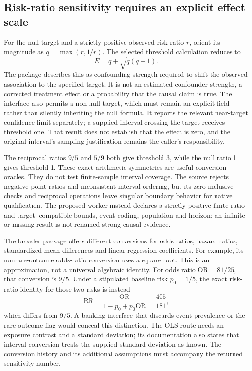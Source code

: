 \subsection{Risk-ratio sensitivity requires an explicit effect scale}
\label{exec23:sensitivity-reuse-ratio}
For the null target and a strictly positive observed risk ratio $r$, orient
its magnitude as $q=\max(r,1/r)$. The selected threshold calculation reduces to
\[
 E=q+\sqrt{q(q-1)}.
\]
The package describes this as confounding strength required to shift the
observed association to the specified target. It is not an estimated
confounder strength, a corrected treatment effect or a probability that the
causal claim is true. The interface also permits a non-null target, which must
remain an explicit field rather than silently inheriting the null formula.
It reports the relevant near-target confidence limit separately; a supplied
interval crossing the target receives threshold one. That result does not
establish that the effect is zero, and the original interval's sampling
justification remains the caller's responsibility.
\citep{exec23_sensitivity_evalue}

The reciprocal ratios $9/5$ and $5/9$ both give threshold 3, while the null
ratio 1 gives threshold 1. These exact arithmetic symmetries are useful
conversion oracles. They do not test finite-sample interval coverage. The
source rejects negative point ratios and inconsistent interval ordering, but
its zero-inclusive checks and reciprocal operations leave singular boundary
behavior for native qualification. The proposed worker instead declares a
strictly positive finite ratio and target, compatible bounds, event coding,
population and horizon; an infinite or missing result is not renamed strong
causal evidence.
\citep{exec23_sensitivity_evalue,exec23_sensitivity_reference}

The broader package offers different conversions for odds ratios, hazard
ratios, standardized mean differences and linear-regression coefficients.
For example, its nonrare-outcome odds-ratio conversion uses a square root.
This is an approximation, not a universal algebraic identity. For odds ratio
$\mathrm{OR}=81/25$, that conversion is $9/5$. Under a stipulated baseline
risk $p_0=1/5$, the exact risk-ratio identity for those two risks is instead
\[
 \mathrm{RR}=\frac{\mathrm{OR}}{1-p_0+p_0\mathrm{OR}}
             =\frac{405}{181},
\]
which differs from $9/5$. A banking interface that discards event prevalence
or the rare-outcome flag would conceal this distinction. The OLS route needs
an exposure contrast and a standard deviation; its documentation also states
that interval conversion treats the supplied standard deviation as known.
The conversion history and its additional assumptions must accompany the
returned sensitivity number.
\citep{exec23_sensitivity_evalue,exec23_sensitivity_reference}

